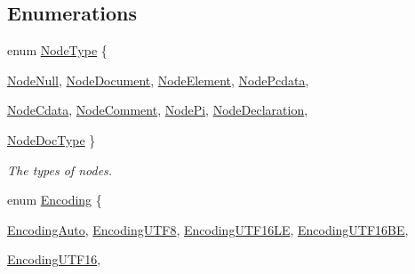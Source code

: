 \subsection*{Enumerations}
\begin{DoxyCompactItemize}
\item 
enum \hyperlink{namespacephys_1_1xml_a668b0cc666a9d49f7c7222a7552115d3}{NodeType} \{ \par
\hyperlink{namespacephys_1_1xml_a668b0cc666a9d49f7c7222a7552115d3af6e95d4a0b6115c76b339961bc58d742}{NodeNull}, 
\hyperlink{namespacephys_1_1xml_a668b0cc666a9d49f7c7222a7552115d3acfe92e6bd275972917b95f08bd46e09f}{NodeDocument}, 
\hyperlink{namespacephys_1_1xml_a668b0cc666a9d49f7c7222a7552115d3a92facb9678134df6404ce63e7e48624c}{NodeElement}, 
\hyperlink{namespacephys_1_1xml_a668b0cc666a9d49f7c7222a7552115d3ab48d4b88d7a7757e3e8505c90db3b2bf}{NodePcdata}, 
\par
\hyperlink{namespacephys_1_1xml_a668b0cc666a9d49f7c7222a7552115d3a353968e806a751a6da4f7ac115b4ab55}{NodeCdata}, 
\hyperlink{namespacephys_1_1xml_a668b0cc666a9d49f7c7222a7552115d3a25b778cb61ae0a9f15590cad5e0120d2}{NodeComment}, 
\hyperlink{namespacephys_1_1xml_a668b0cc666a9d49f7c7222a7552115d3a3c09d11be0cea840f23f55e084cf72fa}{NodePi}, 
\hyperlink{namespacephys_1_1xml_a668b0cc666a9d49f7c7222a7552115d3a1e3789aa995b7bf563ca8c43553ac035}{NodeDeclaration}, 
\par
\hyperlink{namespacephys_1_1xml_a668b0cc666a9d49f7c7222a7552115d3aca750034b7e4a34d53cfd3399b2bcd99}{NodeDocType}
 \}
\begin{DoxyCompactList}\small\item\em The types of nodes. \item\end{DoxyCompactList}\item 
enum \hyperlink{namespacephys_1_1xml_a420f5de782438f88160321385bea2015}{Encoding} \{ \par
\hyperlink{namespacephys_1_1xml_a420f5de782438f88160321385bea2015a2792ef334e1061e7ad177df463256d85}{EncodingAuto}, 
\hyperlink{namespacephys_1_1xml_a420f5de782438f88160321385bea2015a7793b4cde174342c9450abbeab675743}{EncodingUTF8}, 
\hyperlink{namespacephys_1_1xml_a420f5de782438f88160321385bea2015aa5e6a756e80683f376d1ef0a03b21d56}{EncodingUTF16LE}, 
\hyperlink{namespacephys_1_1xml_a420f5de782438f88160321385bea2015a04fd7b1fef8d2dcc67a46b8fe4dbcaf4}{EncodingUTF16BE}, 
\par
\hyperlink{namespacephys_1_1xml_a420f5de782438f88160321385bea2015ac19070aaf7044426b0fe8fa5af956130}{EncodingUTF16}, 

\end{DoxyCompactItemize}
